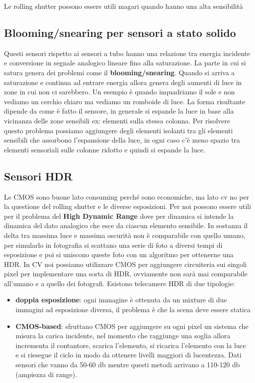 \begin{nota}
    Le rolling shutter possono essere utili magari quando hanno una alta sensibilità
\end{nota}


\subsection{Blooming/snearing per sensori a stato solido}

Questi sensori rispetto ai sensori a tubo hanno una relazione tra energia incidente 
e conversione in segnale analogico lineare fino alla saturazione. La parte in cui 
si satura genera dei problemi come il \textbf{blooming/snearing}.
Quando si arriva a saturazione e continua 
ad entrare energia allora genera degli aumenti di luce in zone in cui non ci 
sarebbero. Un esempio è quando inquadriamo il sole e non vediamo un cerchio 
chiaro ma vediamo un romboide di luce. La forma risultante dipende da come è 
fatto il sensore, in generale si espande la luce in base alla vicinanza delle 
zone sensibili ex: elementi sulla stessa colonna. Per risolvere questo problema 
possiamo aggiungere degli elementi isolanti tra gli elementi sensibili che assorbono
l'espansione della luce, in ogni caso c'è meno spazio tra elementi sensoriali
sulle colonne ridotto e quindi si espande la luce.



\subsection{Sensori HDR}
Le CMOS sono buone lato consuming perché sono economiche, ma lato cv no per
la questione del rolling shutter e le diverse esposizioni. Per noi possono essere
utili per il problema del \textbf{High Dynamic Range} dove per dinamica si intende 
la dinamica del dato analogico che esce da ciascun elemento sensibile. In sostanza 
il delta tra massima luce e massima oscurità non è comparabile con quello umano,
per simularlo in fotografia si scattano una serie di foto a diversi tempi di esposizione 
e poi si uniscono queste foto con un algoritmo per ottenerne una HDR. In CV noi possiamo 
utilizzare CMOS per aggiungere circuiteria sui singoli pixel per implementare una 
sorta di HDR, ovviamente non sarà mai comparabile all'umano e a quello dei fotografi.
Esistono telecamere HDR di due tipologie:
\begin{itemize}
    \item \textbf{doppia esposizione}: ogni immagine è ottenuta da un mixture di 
    due immagini ad esposizione diversa, il problema è che la scena deve essere statica
    \item \textbf{CMOS-based}: sfruttano CMOS per aggiungere su ogni pixel un sistema che misura 
    la carica incidente, nel momento che raggiunge una soglia allora incrementa 
    il contantore, scarica l'elemento, si ricarica l'elemento con la luce e si 
    riesegue il ciclo in modo da ottenere livelli maggiori di lucentezza. Dati 
    sensori che vanno da 50-60 db mentre questi metodi arrivano a 110-120 db (ampiezza di range).
\end{itemize}

